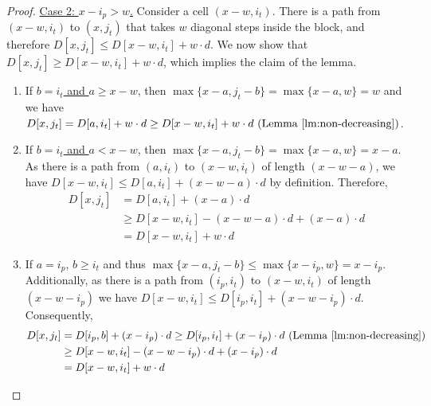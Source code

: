 \begin{proof}
\noindent
\underline{Case 2: $x-i_p > w$.} Consider a cell $(x-w,i_t)$. There is a path from $(x-w,i_t)$ to $(x,j_t)$ that takes $w$ diagonal steps inside the block, and therefore $D[x,j_t] \leq D[x-w,i_t]+w \cdot d$. We now show that $D[x,j_t] \geq D[x-w,i_t]+w\cdot d$, which implies the claim of the lemma.
\begin{enumerate}[label=(\alph*)]

\item If \underline{$b=i_t$ and $a \ge x-w$},
then $\max\{x-a,j_t-b\} = \max\{x-a,w\}=w$ and we have $D[x,j_t] =D[a,i_t]+w\cdot d \geq D[x-w,i_t] +w\cdot d \text{ (Lemma~\ref{lm:non-decreasing})}$. 

\item  If \underline{$b=i_t$ and $a < x-w$}, then $\max\{x-a,j_t-b\}= \max\{x-a,w\}=x-a$. As there is a path from $(a,i_t)$ to $(x-w,i_t)$ of length $(x-w-a)$, we have $D[x-w,i_t] \leq D[a,i_t] + (x-w-a) \cdot d$ by definition. Therefore, 
\begin{align*}
D[x,j_t]&=D[a,i_t]+(x-a)\cdot d\\
& \geq D[x-w,i_t] - (x-w-a) \cdot d+(x-a) \cdot d\\
& = D[x-w,i_t] + w\cdot d
\end{align*}
%
\item If \underline{$a=i_p$}, 
$b \geq i_t$ and thus $\max\{x-a,j_t-b\} \leq \max\{x-i_p,w\} = x-i_p$. Additionally, as there is a path from $(i_p,i_t)$ to $(x-w,i_t)$ of length $(x-w - i_p)$ we have $D[x-w,i_t] \le D[i_p,i_t] + (x-w-i_p) \cdot d$. Consequently,
\begin{align*}
D[x,j_t]&=D[i_p,b]+(x-i_p)\cdot d \geq D[i_p,i_t] +(x-i_p)\cdot d \text{ (Lemma~\ref{lm:non-decreasing})} \\
& \geq D[x-w,i_t] - (x-w-i_p) \cdot d +(x-i_p)\cdot d\\
& = D[x-w,i_t] + w\cdot d
\end{align*}
\end{enumerate}
\end{proof}



